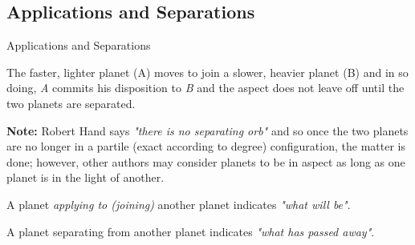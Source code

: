 \subsection{Applications and Separations}

\begin{frame}[t]{Applications and Separations}
\begin{block}{}
The faster, lighter planet (A) moves to join a slower, heavier planet (B) and in so doing, \textsl{A} commits his disposition to \textsl{B} and the aspect does not leave off until the two planets are separated.
\end{block}

\begin{mdframed}[backgroundcolor=gray!5, rightmargin=2em, leftmargin=2em]
\textbf{Note:} Robert Hand says \textsl{"there is no separating orb"} and so once the two planets are no longer in a partile (exact according to degree) configuration, the matter is done; however, other authors may consider planets to be in aspect as long as one planet is in the light of another.\footnotemark[1]
\end{mdframed}

\begin{block}{}
A planet \textsl{applying to (joining)} another planet indicates \textsl{"what will be"}. 
\end{block}

\begin{block}{}
A planet separating from another planet indicates \textsl{"what has passed away"}.
\end{block}


\end{frame}